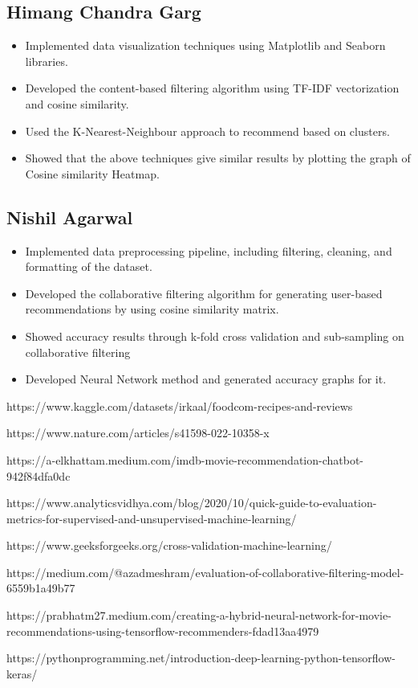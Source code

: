 \documentclass[conference]{IEEEtran}
\begin{document}
\subsection{Himang Chandra Garg}
\begin{itemize}
    \item Implemented data visualization techniques using Matplotlib and Seaborn libraries.
    \item Developed the content-based filtering algorithm using TF-IDF vectorization and cosine similarity.
    \item Used the K-Nearest-Neighbour approach to recommend based on clusters.
    \item Showed that the above techniques give similar results by plotting the graph of Cosine similarity Heatmap.
\end{itemize}

\subsection{Nishil Agarwal}
\begin{itemize}
    \item Implemented data preprocessing pipeline, including filtering, cleaning, and formatting of the dataset.
    \item Developed the collaborative filtering algorithm for generating user-based recommendations by using cosine similarity matrix.
    \item Showed accuracy results through k-fold cross validation and sub-sampling on collaborative filtering
    \item Developed Neural Network method and generated accuracy graphs for it.
\end{itemize}

\begin{thebibliography}{99}
https://www.kaggle.com/datasets/irkaal/foodcom-recipes-and-reviews
\item https://www.nature.com/articles/s41598-022-10358-x
\item https://a-elkhattam.medium.com/imdb-movie-recommendation-chatbot-942f84dfa0dc
\item https://www.analyticsvidhya.com/blog/2020/10/quick-guide-to-evaluation-metrics-for-supervised-and-unsupervised-machine-learning/
\item https://www.geeksforgeeks.org/cross-validation-machine-learning/
\item https://medium.com/@azadmeshram/evaluation-of-collaborative-filtering-model-6559b1a49b77
\item https://prabhatm27.medium.com/creating-a-hybrid-neural-network-for-movie-recommendations-using-tensorflow-recommenders-fdad13aa4979
\item https://pythonprogramming.net/introduction-deep-learning-python-tensorflow-keras/
\end{thebibliography}
\end{document}

